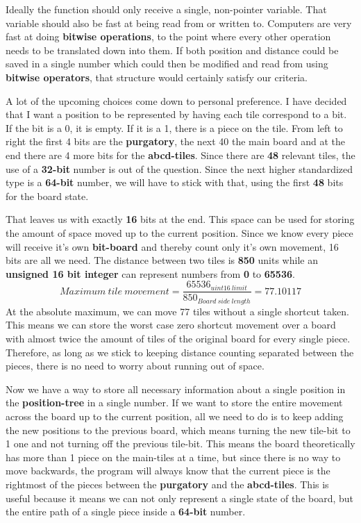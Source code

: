 \documentclass[12pt]{article}
\begin{document}
Ideally the function should only receive a single, non-pointer variable. That variable should also be fast at being read from or written to. 
Computers are very fast at doing \textbf{bitwise operations}, to the point where every other operation needs to be translated down into them. If both position and distance could be saved in a single number which could then be modified and read from using \textbf{bitwise operators}, that structure would certainly satisfy our criteria.

A lot of the upcoming choices come down to personal preference. I have decided that I want a position to be represented by having each tile correspond to a bit. If the bit is a 0, it is empty. If it is a 1, there is a piece on the tile. From left to right the first 4 bits are the \textbf{purgatory}, the next 40 the main board and at the end there are 4 more bits for the \textbf{abcd-tiles}.
Since there are \textbf{48} relevant tiles, the use of a \textbf{32-bit} number is out of the question. Since the next higher standardized type is a \textbf{64-bit} number, we will have to stick with that, using the first \textbf{48} bits for the board state.

That leaves us with exactly \textbf{16} bits at the end. This space can be used for storing the amount of space moved up to the current position. Since we know every piece will receive it's own \textbf{bit-board} and thereby count only it's own movement, 16 bits are all we need. The distance between two tiles is \textbf{850} units while an \textbf{unsigned 16 bit integer} can represent numbers from \textbf{0} to \textbf{65536}.
\[
    Maximum~tile ~movement = \frac{65536_{uint16~limit}}{850_{Board~side~length}} = 77.10117
\]
At the absolute maximum, we can move 77 tiles without a single shortcut taken.
This means we can store the worst case zero shortcut movement over a board with almost twice the amount of tiles of the original board for every single piece. Therefore, as long as we stick to keeping distance counting separated between the pieces, there is no need to worry about running out of space.

Now we have a way to store all necessary information about a single position in the \textbf{position-tree} in a single number. If we want to store the entire movement across the board up to the current position, all we need to do is to keep adding the new positions to the previous board, which means turning the new tile-bit to 1 one and not turning off the previous tile-bit. This means the board theoretically has more than 1 piece on the main-tiles at a time, but since there is no way to move backwards, the program will always know that the current piece is the rightmost of the pieces between the \textbf{purgatory} and the \textbf{abcd-tiles}. This is useful because it means we can not only represent a single state of the board, but the entire path of a single piece inside a \textbf{64-bit} number.
\end{document}
